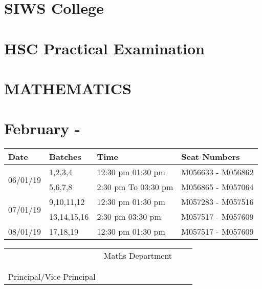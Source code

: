 \documentclass[17pt]{extarticle}
\begin{document}
\section*{SIWS College}
\section*{HSC Practical Examination }
\section*{MATHEMATICS}
\section*{February - \the\year }
\Large
\vspace{5mm}
\begin{center}
\begin{tabular}{ | m{3.5cm} | m{4cm}| m{7.5cm} |  m{7.5cm} | } 
  \hline
  Date
  &Batches
  &Time
  &Seat Numbers
  \\ 
   
  \hline
  \multirow{2}{*}{06/01/19 }
  &1,2,3,4
  &12:30 pm 01:30 pm 
  &M056633 - M056862 \\\cline{2-4}
  
  & 5,6,7,8
  & 2:30 pm To 03:30 pm
  & M056865 - M057064
  \\ 
    
  \hline
   \multirow{2}{*}{07/01/19 }
    & 9,10,11,12 
    & 12:30 pm 01:30 pm
    &M057283 - M057516 \\\cline{2-4}
    
    & 13,14,15,16 
    & 2:30 pm 03:30 pm 
    &M057517 - M057609
    \\ 
  \hline

    08/01/19 
    & 17,18,19
    & 12:30 pm 01:30 pm 
    &M057517 - M057609
    \\ 
  \hline


\end{tabular}
\vspace{1cm}

\end{center}
\vspace{6mm}

\begin{tabu} to 1\textwidth {X[l] X[r]}
  & Maths Department\ \ \ \  \\
 \\ \\ 
  Principal/Vice-Principal&
\end{tabu}
\end{document}
